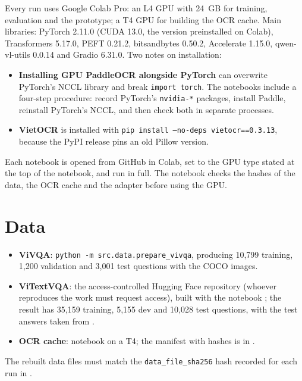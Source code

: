 Every run uses Google Colab Pro: an L4 GPU with 24~GB for training, evaluation and the
prototype; a T4 GPU for building the OCR cache. Main libraries: PyTorch 2.11.0 (CUDA 13.0, the
version preinstalled on Colab), Transformers 5.17.0, PEFT 0.21.2, bitsandbytes 0.50.2,
Accelerate 1.15.0, qwen-vl-utils 0.0.14 and Gradio 6.31.0. Two notes on installation:

\begin{itemize}
  \item \textbf{Installing GPU PaddleOCR alongside PyTorch} can overwrite PyTorch's NCCL library
  and break \texttt{import torch}. The notebooks include a four-step procedure: record PyTorch's
  \texttt{nvidia-*} packages, install Paddle, reinstall PyTorch's NCCL, and then check both in
  separate processes.
  \item \textbf{VietOCR} is installed with \texttt{pip install --no-deps vietocr==0.3.13},
  because the PyPI release pins an old Pillow version.
\end{itemize}

Each notebook is opened from GitHub in Colab, set to the GPU type stated at the top of the
notebook, and run in full. The notebook checks the hashes of the data, the OCR cache and the
adapter before using the GPU.

\section{Data}

\begin{itemize}
  \item \textbf{ViVQA}: \texttt{python -m src.data.prepare\_vivqa}, producing 10,799 training,
  1,200 validation and 3,001 test questions with the COCO images.
  \item \textbf{ViTextVQA}: the access-controlled Hugging Face repository
   (whoever reproduces the work must request access), built with
  the notebook ; the result has 35,159 training, 5,155
  dev and 10,028 test questions, with the test answers taken from
  .
  \item \textbf{OCR cache}: notebook  on a T4; the manifest
  with hashes is in .
\end{itemize}

The rebuilt data files must match the \texttt{data\_file\_sha256} hash recorded for each run in
.

